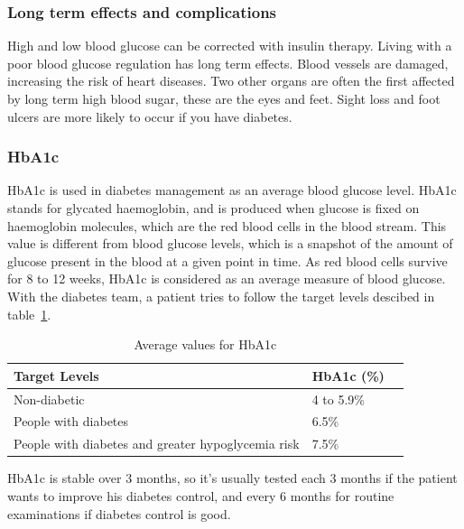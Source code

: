\subsubsection{Long term effects and complications}
High and low blood glucose can be corrected with insulin therapy. Living with a poor blood glucose regulation has long term effects. Blood vessels are damaged, increasing the risk of heart diseases. Two other organs are often the first affected by long term high blood sugar, these are the eyes and feet. Sight loss and foot ulcers are more likely to occur if you have diabetes.  

\subsubsection{HbA1c}
HbA1c is used in diabetes management as an average blood glucose level. HbA1c stands for glycated haemoglobin, and is produced when glucose is fixed on haemoglobin molecules, which are the red blood cells in the blood stream. 
This value is different from blood glucose levels, which is a snapshot of the amount of glucose present in the blood at a given point in time. As red blood cells survive for 8 to 12 weeks, HbA1c is considered as an average measure of blood glucose. With the diabetes team, a patient tries to follow the target levels descibed in table~\ref{table:hba1cValues}.

\begin{table}
    \begin{tabular}{|l|l|l|}
    \hline
    Target Levels & HbA1c (\%) \\ \hline
    Non-diabetic          & 4 to 5.9\%                    \\ 
    People with diabetes       & 6.5\%                                         \\ 
    People with diabetes and greater hypoglycemia risk           & 7.5\% \\ \hline
    \end{tabular}
    
    \caption{Average values for HbA1c}
    \label{table:hba1cValues}
\end{table}


HbA1c is stable over 3 months, so it's usually tested each 3 months if the patient wants to improve his diabetes control, and every 6 months for routine examinations if diabetes control is good.

